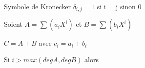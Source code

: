 \documentclass[a4paper, 12pt]{article}
\begin{document}
Symbole de Kronecker $\delta_{i,j} = 1$ si i = j sinon 0





\begin{proprietes}
\end{proprietes}

\begin{demonstration}
    Soient $A = \sum(a_i X^i)$ et $B = \sum(b_i X^i)$
    
    $C = A + B$ avec $c_i = a_i + b_i$

    Si $i \gt max(degA, degB)$ alors
\end{demonstration}












\end{document}
